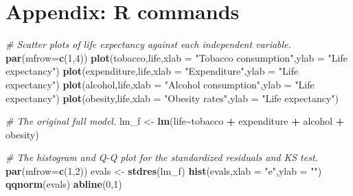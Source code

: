 \documentclass[
]{article}
\newenvironment{Shaded}{\begin{snugshade}}{\end{snugshade}}
\newcommand{\AttributeTok}[1]{\textcolor[rgb]{0.13,0.29,0.53}{#1}}
\newcommand{\CommentTok}[1]{\textcolor[rgb]{0.56,0.35,0.01}{\textit{#1}}}
\newcommand{\DecValTok}[1]{\textcolor[rgb]{0.00,0.00,0.81}{#1}}
\newcommand{\FunctionTok}[1]{\textcolor[rgb]{0.13,0.29,0.53}{\textbf{#1}}}
\newcommand{\NormalTok}[1]{#1}
\newcommand{\OtherTok}[1]{\textcolor[rgb]{0.56,0.35,0.01}{#1}}
\newcommand{\SpecialCharTok}[1]{\textcolor[rgb]{0.81,0.36,0.00}{\textbf{#1}}}
\newcommand{\StringTok}[1]{\textcolor[rgb]{0.31,0.60,0.02}{#1}}
\begin{document}
\hypertarget{appendix-r-commands}{%
\section{Appendix: R commands}\label{appendix-r-commands}}

\begin{Shaded}
\end{Shaded}

\begin{Shaded}
\begin{Highlighting}[]
\CommentTok{\# Scatter plots of life expectancy against each independent variable.}
\FunctionTok{par}\NormalTok{(}\AttributeTok{mfrow=}\FunctionTok{c}\NormalTok{(}\DecValTok{1}\NormalTok{,}\DecValTok{4}\NormalTok{))}
\FunctionTok{plot}\NormalTok{(tobacco,life,}\AttributeTok{xlab =} \StringTok{"Tobacco consumption"}\NormalTok{,}\AttributeTok{ylab =} \StringTok{"Life expectancy"}\NormalTok{)}
\FunctionTok{plot}\NormalTok{(expenditure,life,}\AttributeTok{xlab =} \StringTok{"Expenditure"}\NormalTok{,}\AttributeTok{ylab =} \StringTok{"Life expectancy"}\NormalTok{)}
\FunctionTok{plot}\NormalTok{(alcohol,life,}\AttributeTok{xlab =} \StringTok{"Alcohol consumption"}\NormalTok{,}\AttributeTok{ylab =} \StringTok{"Life expectancy"}\NormalTok{)}
\FunctionTok{plot}\NormalTok{(obesity,life,}\AttributeTok{xlab =} \StringTok{"Obesity rates"}\NormalTok{,}\AttributeTok{ylab =} \StringTok{"Life expectancy"}\NormalTok{)}
\end{Highlighting}
\end{Shaded}

\begin{Shaded}
\begin{Highlighting}[]
\CommentTok{\# The original full model.}
\NormalTok{lm\_f }\OtherTok{\textless{}{-}} \FunctionTok{lm}\NormalTok{(life}\SpecialCharTok{\textasciitilde{}}\NormalTok{tobacco }\SpecialCharTok{+}\NormalTok{ expenditure }\SpecialCharTok{+}\NormalTok{ alcohol }\SpecialCharTok{+}\NormalTok{ obesity)}

\CommentTok{\# The histogram and Q{-}Q plot for the standardized residuals and KS test.}
\FunctionTok{par}\NormalTok{(}\AttributeTok{mfrow=}\FunctionTok{c}\NormalTok{(}\DecValTok{1}\NormalTok{,}\DecValTok{2}\NormalTok{))}
\NormalTok{evals }\OtherTok{\textless{}{-}} \FunctionTok{stdres}\NormalTok{(lm\_f)}
\FunctionTok{hist}\NormalTok{(evals,}\AttributeTok{xlab =} \StringTok{"e"}\NormalTok{,}\AttributeTok{ylab =} \StringTok{""}\NormalTok{)}
\FunctionTok{qqnorm}\NormalTok{(evals)}
\FunctionTok{abline}\NormalTok{(}\DecValTok{0}\NormalTok{,}\DecValTok{1}\NormalTok{)}
\end{Highlighting}
\end{Shaded}
\end{document}

